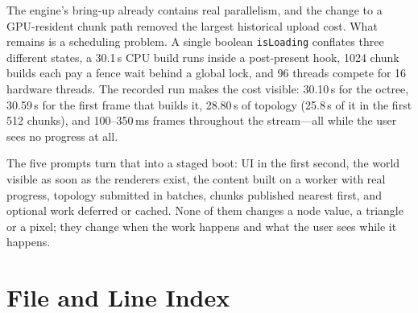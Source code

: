 \documentclass[11pt,a4paper]{article}
\begin{document}
The engine's bring-up already contains real parallelism, and the change to a
GPU-resident chunk path removed the largest historical upload cost. What
remains is a scheduling problem. A single boolean \texttt{isLoading} conflates
three different states, a 30.1\,s CPU build runs inside a post-present hook,
1024 chunk builds each pay a fence wait behind a global lock, and 96 threads
compete for 16 hardware threads. The recorded run makes the cost visible:
30.10\,s for the octree, 30.59\,s for the first frame that builds it,
28.80\,s of topology (25.8\,s of it in the first 512 chunks), and 100--350\,ms
frames throughout the stream---all while the user sees no progress at all.

The five prompts turn that into a staged boot: UI in the first second, the
world visible as soon as the renderers exist, the content built on a worker
with real progress, topology submitted in batches, chunks published nearest
first, and optional work deferred or cached. None of them changes a node
value, a triangle or a pixel; they change when the work happens and what the
user sees while it happens.

\appendix

\section{File and Line Index}
\end{document}
